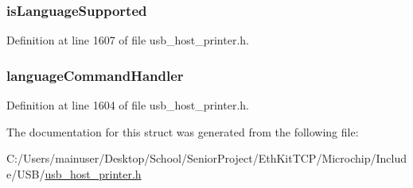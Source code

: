 \subsubsection[{is\+Language\+Supported}]{ is\+Language\+Supported}\label{struct_u_s_b___p_r_i_n_t_e_r___i_n_t_e_r_f_a_c_e_ad38e7848adc176375ef54731b46ea63b}


Definition at line 1607 of file usb\+\_\+host\+\_\+printer.\+h.

\hypertarget{struct_u_s_b___p_r_i_n_t_e_r___i_n_t_e_r_f_a_c_e_a7095f4841419206d1173f4a7a054b65f}{}
\subsubsection[{language\+Command\+Handler}]{ language\+Command\+Handler}\label{struct_u_s_b___p_r_i_n_t_e_r___i_n_t_e_r_f_a_c_e_a7095f4841419206d1173f4a7a054b65f}


Definition at line 1604 of file usb\+\_\+host\+\_\+printer.\+h.



The documentation for this struct was generated from the following file\+:\begin{DoxyCompactItemize}
\item 
C\+:/\+Users/mainuser/\+Desktop/\+School/\+Senior\+Project/\+Eth\+Kit\+T\+C\+P/\+Microchip/\+Include/\+U\+S\+B/\hyperlink{usb__host__printer_8h}{usb\+\_\+host\+\_\+printer.\+h}\end{DoxyCompactItemize}
